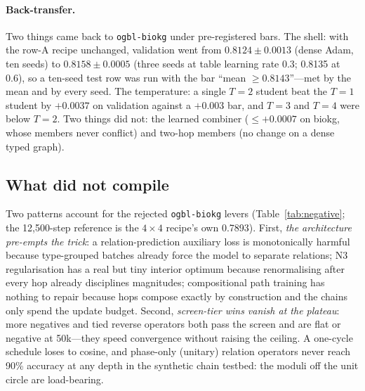 \documentclass[11pt,a4paper]{article}
\begin{document}
\paragraph{Back-transfer.}
Two things came back to \texttt{ogbl-biokg} under pre-registered bars.
The shell: with the row-A recipe unchanged, validation went from
$0.8124\pm0.0013$ (dense Adam, ten seeds) to $0.8158\pm0.0005$ (three
seeds at table learning rate 0.3; 0.8135 at 0.6), so a ten-seed test row
was run with the bar ``mean $\ge0.8143$''---met by the mean and by every
seed. The temperature: a single $T=2$ student beat the $T=1$ student by
$+0.0037$ on validation against a $+0.003$ bar, and $T=3$ and $T=4$ were
below $T=2$. Two things did not: the learned combiner ($\le+0.0007$ on
biokg, whose members never conflict) and two-hop members (no change on a
dense typed graph).

\subsection{What did not compile}
\label{sec:negative}

Two patterns account for the rejected \texttt{ogbl-biokg} levers
(Table~\ref{tab:negative}; the 12{,}500-step reference is the $4\times4$
recipe's own 0.7893). First, \emph{the architecture pre-empts the trick}:
a relation-prediction auxiliary loss \citep{chen2021relation} is
monotonically harmful because type-grouped batches already force the
model to separate relations; N3 regularisation
\citep{lacroix2018canonical} has a real but tiny interior optimum because
renormalising after every hop already disciplines magnitudes;
compositional path training \citep{guu2015traversing} has nothing to
repair because hops compose exactly by construction and the chains only
spend the update budget. Second, \emph{screen-tier wins vanish at the
plateau}: more negatives and tied reverse operators both pass the screen
and are flat or negative at 50k---they speed convergence without raising
the ceiling. A one-cycle schedule loses to cosine, and phase-only
(unitary) relation operators never reach 90\% accuracy at any depth in
the synthetic chain testbed: the moduli off the unit circle are
load-bearing.
\end{document}
